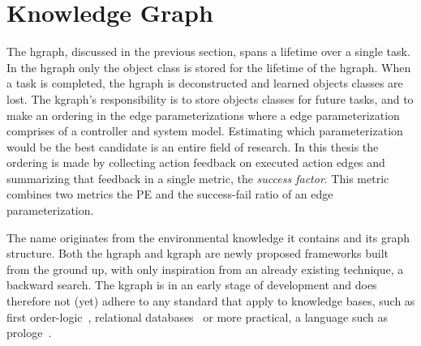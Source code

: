 \section{Knowledge Graph}%
\label{sec:kgraph}
The \ac{hgraph}, discussed in the previous section, spans a lifetime over a single task. In the \ac{hgraph} only the object class is stored for the lifetime of the \ac{hgraph}. When a task is completed, the \ac{hgraph} is deconstructed and learned objects classes are lost. The \ac{kgraph}'s responsibility is to store objects classes for future tasks, and to make an ordering in the edge parameterizations where a edge parameterization comprises of a controller and system model. Estimating which parameterization would be the best candidate is an entire field of research. In this thesis the ordering is made by collecting action feedback on executed action edges and summarizing that feedback in a single metric, the \textit{success factor}. This metric combines two metrics the \acl{PE} and the success-fail ratio of an edge parameterization.\bs

The name  originates from the environmental knowledge it contains and its graph structure. Both the \ac{hgraph} and \ac{kgraph} are newly proposed frameworks built from the ground up, with only inspiration from an already existing technique, a backward search. The \ac{kgraph} is in an early stage of development and does therefore not (yet) adhere to any standard that apply to knowledge bases, such as first order-logic~\cite{barwise_introduction_1977,rensink_representing_2004}, relational databases~\cite{atzeni_relational_1993} or more practical, a language such as prologe~\cite{wielemaker_swiprolog_2012}.\bs






